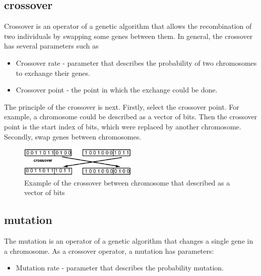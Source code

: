 \subsection{crossover}
Crossover is an operator of a genetic algorithm that allows the recombination of two individuals by swapping some genes between them.
In general, the crossover has several parameters such as
\begin{itemize}
	\item Crossover rate - parameter that describes the probability of two chromosomes to exchange their genes.
	\item Crossover point - the point in which the exchange could be done.
\end{itemize}

The principle of the crossover is next.
Firstly, select the crossover point. For example, a chromosome could be described as a vector of bits. Then the crossover point is the start index of bits, which were replaced by another chromosome.
Secondly, swap genes between chromosomes.

\begin{figure}
	\centering
	\includegraphics[width=0.5\textwidth]{images/crossoverVector.png}
	\caption[Example of the crossover]{Example of the crossover between chromosome that described as a vector of bits}
	\label{fig:crossoverVector}
\end{figure}

\subsection{mutation}

The mutation is an operator of a genetic algorithm that changes a single gene in a chromosome. As a crossover operator, a mutation has parameters:

\begin{itemize}
	\item Mutation rate - parameter that describes the probability mutation.
\end{itemize}

